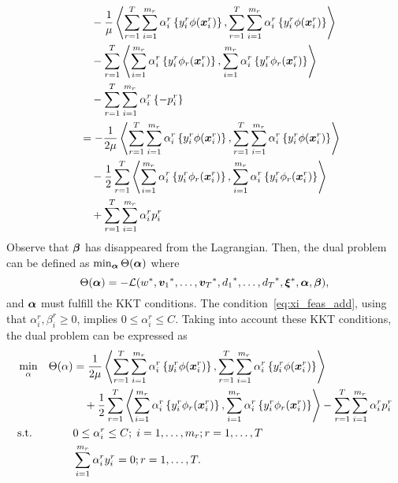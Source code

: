\begin{equation}
\begin{aligned}
        &\qquad - \frac{1}{\mu} \left\langle  \sum_{r= 1}^T \sum_{i=1}^{m_r} {\alpha_i^r} \left\lbrace y_i^r \phi(\bm{x}_i^r) \right\rbrace,  \sum_{r= 1}^T \sum_{i=1}^{m_r} {\alpha_i^r} \left\lbrace y_i^r \phi(\bm{x}_i^r) \right\rbrace \right\rangle \\
        &\qquad -  \sum_{r= 1}^T {\left\langle \sum_{i=1}^{m_r} {\alpha_i^r} \left\lbrace y_i^r \phi_r(\bm{x}_i^r) \right\rbrace, \sum_{i=1}^{m_r} {\alpha_i^r} \left\lbrace y_i^r \phi_r(\bm{x}_i^r) \right\rbrace \right\rangle} \\
        &\qquad -  \sum_{r= 1}^T \sum_{i=1}^{m_r} \alpha_i^r \left\lbrace - p_{i}^r  \right\rbrace \\
        &\quad = - \frac{1}{2\mu} \left\langle  \sum_{r= 1}^T \sum_{i=1}^{m_r} {\alpha_i^r} \left\lbrace y_i^r \phi(\bm{x}_i^r) \right\rbrace,  \sum_{r= 1}^T \sum_{i=1}^{m_r} {\alpha_i^r} \left\lbrace y_i^r \phi(\bm{x}_i^r) \right\rbrace \right\rangle \\
        &\qquad - \frac{1}{2} \sum_{r= 1}^T {\left\langle \sum_{i=1}^{m_r} {\alpha_i^r} \left\lbrace y_i^r \phi_r(\bm{x}_i^r) \right\rbrace, \sum_{i=1}^{m_r} {\alpha_i^r} \left\lbrace y_i^r \phi_r(\bm{x}_i^r) \right\rbrace \right\rangle} \\
        &\qquad +  \sum_{r= 1}^T \sum_{i=1}^{m_r} \alpha_i^r  p_{i}^r 
    \end{aligned}
\end{equation}
Observe that $\bm{\beta}$ has disappeared from the Lagrangian.
Then, the dual problem can be defined as $\min_{\bm{\alpha}} \Theta(\bm{\alpha})$ where 
$$ \Theta(\bm{\alpha}) = - \mathcal{L}({{w}}^*, {\bm{v}_1}^*, \ldots, {\bm{v}_T}^*, {d_1}^*, \ldots, {d_T}^*, {\bm{\xi}}^*, \bm{\alpha}, \bm{\beta}), $$
and $\bm{\alpha}$ must fulfill the KKT conditions. The condition~\eqref{eq:xi_feas_add}, using that $\alpha_i^r , \beta_i^r \geq 0$, implies $0 \leq \alpha_i^r \leq C$. Taking into account these KKT conditions, the dual problem can be expressed as
\begin{equation}\label{eq:svmmtl_dual_add}
    \begin{aligned}
    & \min_{\alpha} & \Theta(\alpha) &=  \frac{1}{2\mu} \dotp{ \sum_{r= 1}^T \sum_{i=1}^{m_r} {\alpha_i^r} \left\lbrace y_i^r \phi(\fv{x}_i^r) \right\rbrace}{ \sum_{r= 1}^T \sum_{i=1}^{m_r} {\alpha_i^r} \left\lbrace y_i^r \phi(\fv{x}_i^r) \right\rbrace} \\
    & & &\quad + \frac{1}{2} \sum_{r= 1}^T {\dotp{\sum_{i=1}^{m_r} {\alpha_i^r} \left\lbrace y_i^r \phi_r(\fv{x}_i^r) \right\rbrace}{\sum_{i=1}^{m_r} {\alpha_i^r} \left\lbrace y_i^r \phi_r(\fv{x}_i^r) \right\rbrace}}  - \sum_{r=1}^\ntasks \sum_{i=1}^{\npertask_r} \alpha_i^r p_i^r \\
    & \text{s.t.}
    & & 0 \leq \alpha_i^r \leq C ; \; i=1, \ldots, m_r; r=1, \ldots, \ntasks \\
    & & & \sum_{i=1}^{m_r} \alpha_i^r y_i^r = 0;  r=1, \ldots, \ntasks . \\
    \end{aligned}
\end{equation}
